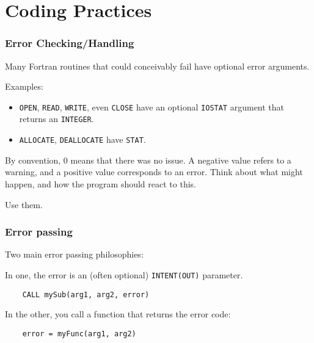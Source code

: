 \section{Coding Practices}

%     
% 
% 
% 
% 
% 
% 

\begin{frame}
    \frametitle{Error Checking/Handling}
    Many Fortran routines that could conceivably fail have 
    optional error arguments.

    Examples:

    \begin{itemize}
        \item \texttt{OPEN}, \texttt{READ}, \texttt{WRITE}, even \texttt{CLOSE} have an optional \texttt{IOSTAT} argument that returns an \texttt{INTEGER}.
        \item \texttt{ALLOCATE}, \texttt{DEALLOCATE} have \texttt{STAT}.
    \end{itemize}

    By convention, 0 means that there was no issue. A negative value refers to a warning, and a positive value corresponds to an error.
    Think about what might happen, and how the program should react to this.

    Use them.
\end{frame}

\begin{frame}[fragile]
    \frametitle{Error passing}
    Two main error passing philosophies:

    In one, the error is an (often optional) \texttt{INTENT(OUT)} parameter. 
    \begin{lstlisting}
    CALL mySub(arg1, arg2, error)
    \end{lstlisting}

    In the other, you call a function that returns the error code:
    \begin{lstlisting}
    error = myFunc(arg1, arg2)
    \end{lstlisting}

\end{frame}

